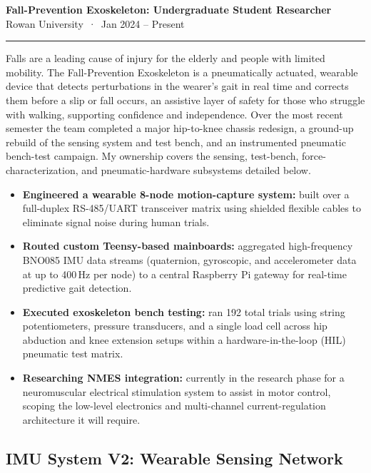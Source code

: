\documentclass[10pt,letterpaper]{article}
\begin{document}

{\large\bfseries Fall-Prevention Exoskeleton: Undergraduate Student Researcher}\\
Rowan University \,·\, Jan 2024 -- Present
\vspace{2pt}
\hrule
\vspace{4pt}

Falls are a leading cause of injury for the elderly and people with limited
mobility. The Fall-Prevention Exoskeleton is a pneumatically actuated,
wearable device that detects perturbations in the wearer's gait in real time
and corrects them before a slip or fall occurs, an assistive layer of
safety for those who struggle with walking, supporting confidence and
independence. Over the most recent semester the team completed a major
hip-to-knee chassis redesign, a ground-up rebuild of the sensing system and
test bench, and an instrumented pneumatic bench-test campaign. My ownership
covers the sensing, test-bench, force-characterization, and
pneumatic-hardware subsystems detailed below.

\begin{itemize}
  \item \textbf{Engineered a wearable 8-node motion-capture system:} built
        over a full-duplex RS-485/UART transceiver matrix using shielded
        flexible cables to eliminate signal noise during human trials.
  \item \textbf{Routed custom Teensy-based mainboards:} aggregated
        high-frequency BNO085 IMU data streams (quaternion, gyroscopic,
        and accelerometer data at up to 400\,Hz per node) to a central
        Raspberry Pi gateway for real-time predictive gait detection.
  \item \textbf{Executed exoskeleton bench testing:} ran 192 total trials
        using string potentiometers, pressure transducers, and a single
        load cell across hip abduction and knee extension setups within a
        hardware-in-the-loop (HIL) pneumatic test matrix.
  \item \textbf{Researching NMES integration:} currently in the research
        phase for a neuromuscular electrical stimulation system to assist
        in motor control, scoping the low-level electronics and
        multi-channel current-regulation architecture it will require.
\end{itemize}

\subsection*{IMU System V2: Wearable Sensing Network}
\end{document}
